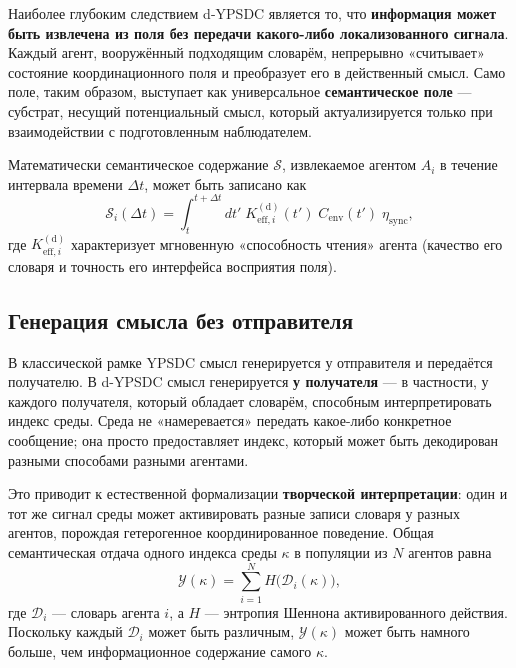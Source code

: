 \documentclass[12pt,a4paper]{article}
\theoremstyle{remark}
\begin{document}
	Наиболее глубоким следствием d-YPSDC является то, что \textbf{информация может быть извлечена из поля без передачи какого-либо локализованного сигнала}. Каждый агент, вооружённый подходящим словарём, непрерывно «считывает» состояние координационного поля и преобразует его в действенный смысл. Само поле, таким образом, выступает как универсальное \textbf{семантическое поле} — субстрат, несущий потенциальный смысл, который актуализируется только при взаимодействии с подготовленным наблюдателем.
	
	Математически семантическое содержание $\mathcal{S}$, извлекаемое агентом $A_i$ в течение интервала времени $\Delta t$, может быть записано как
	\begin{equation}
		\mathcal{S}_i(\Delta t) = \int_{t}^{t+\Delta t} dt' \;
		K_{\mathrm{eff},i}^{\mathrm{(d)}}(t') \; C_{\mathrm{env}}(t') \; \eta_{\mathrm{sync}},
		\label{eq:semantic-content}
	\end{equation}
	где $K_{\mathrm{eff},i}^{\mathrm{(d)}}$ характеризует мгновенную «способность чтения» агента (качество его словаря и точность его интерфейса восприятия поля).
	
	\subsection{Генерация смысла без отправителя}
	\label{subsec:meaning-generation}
	
	В классической рамке YPSDC смысл генерируется у отправителя и передаётся получателю. В d-YPSDC смысл генерируется \textbf{у получателя} — в частности, у каждого получателя, который обладает словарём, способным интерпретировать индекс среды. Среда не «намеревается» передать какое-либо конкретное сообщение; она просто предоставляет индекс, который может быть декодирован разными способами разными агентами.
	
	Это приводит к естественной формализации \textbf{творческой интерпретации}: один и тот же сигнал среды может активировать разные записи словаря у разных агентов, порождая гетерогенное координированное поведение. Общая семантическая отдача одного индекса среды $\kappa$ в популяции из $N$ агентов равна
	\begin{equation}
		\mathcal{Y}(\kappa) = \sum_{i=1}^{N} H\bigl(\mathcal{D}_i(\kappa)\bigr),
		\label{eq:semantic-yield}
	\end{equation}
	где $\mathcal{D}_i$ — словарь агента $i$, а $H$ — энтропия Шеннона активированного действия. Поскольку каждый $\mathcal{D}_i$ может быть различным, $\mathcal{Y}(\kappa)$ может быть намного больше, чем информационное содержание самого $\kappa$.
	
\end{document}
